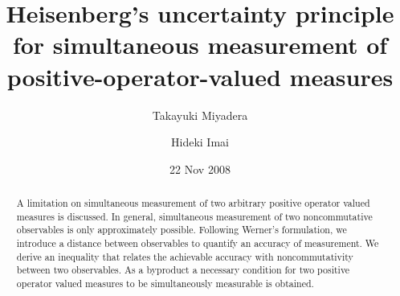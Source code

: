 \documentclass[12pt,showpacs,preprintnumbers,amsmath,amssymb]{revtex4-2}
\begin{document}

\title{
Heisenberg's uncertainty principle
 for simultaneous measurement of positive-operator-valued measures}

\author{Takayuki Miyadera}
\author{Hideki Imai}%
%


\date{22 Nov 2008}%

\begin{abstract}
A limitation on simultaneous measurement of two 
arbitrary positive operator valued measures is discussed. 
In general, simultaneous measurement of two noncommutative 
observables is only approximately possible. 
Following Werner's formulation, we introduce a distance 
between observables to quantify an accuracy of measurement. 
We derive an inequality that relates 
the achievable accuracy with noncommutativity between 
two observables. 
As a byproduct a necessary condition for 
two positive operator valued measures to be simultaneously 
measurable is obtained.    
\end{abstract}

\maketitle
\end{document}
